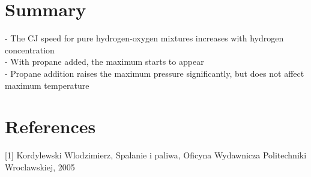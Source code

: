 \documentclass[11pt,a4paper]{article}
\begin{document}
\section{Summary}\label{sec:summary}
- The CJ speed for pure hydrogen-oxygen mixtures increases with hydrogen concentration\\
- With propane added, the maximum starts to appear\\
- Propane addition raises the maximum pressure significantly, but does not affect maximum temperature


\section{References}\label{sec:refs}

[1] Kordylewski Wlodzimierz, Spalanie i paliwa, Oficyna Wydawnicza Politechniki Wroclawskiej, 2005
\end{document}
